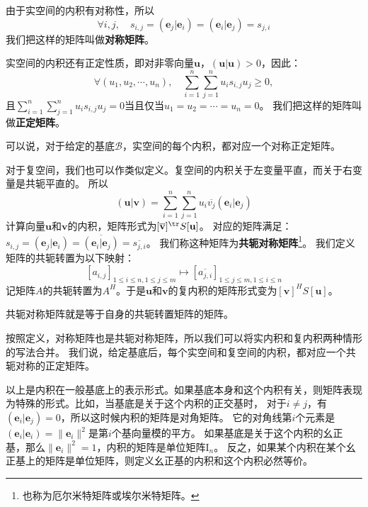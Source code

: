 \documentclass[12pt,UTF8,fontset=none]{ctexbook}
\begin{document}
由于实空间的内积有对称性，所以
$$\forall i, j, \quad s_{i,j} = (\mathbf{e}_j |\mathbf{e}_i ) = (\mathbf{e}_i |\mathbf{e}_j ) = s_{j,i}$$
我们把这样的矩阵叫做\textbf{对称矩阵}。

实空间的内积还有正定性质，即对非零向量$\mathbf{u}$，$(\mathbf{u} | \mathbf{u}) > 0$，因此：
$$\forall (u_1, u_2, \cdots, u_n), \quad \sum_{i=1}^n \sum_{j=1}^n u_i s_{i,j} u_j \geqslant 0,$$
且$\sum_{i=1}^n \sum_{j=1}^n u_i s_{i,j} u_j = 0$当且仅当$u_1 = u_2 = \cdots = u_n = 0$。
我们把这样的矩阵叫做\textbf{正定矩阵}。

可以说，对于给定的基底$\mathcal{B}$，实空间的每个内积，都对应一个对称正定矩阵。

对于复空间，我们也可以作类似定义。复空间的内积关于左变量平直，而关于右变量是共轭平直的。
所以
$$ ( \mathbf{u} |  \mathbf{v} ) = \sum_{i=1}^n \sum_{j=1}^n u_i \overline{v_j} (\mathbf{e}_i|\mathbf{e}_j) $$
计算向量$\mathbf{u}$和$\mathbf{v}$的内积，矩阵形式为$[\overline{\mathbf{v}}]^{\tr} S [\mathbf{u}]$。
对应的矩阵满足：$s_{i,j} = (\mathbf{e}_j|\mathbf{e}_i) = \overline{(\mathbf{e}_i|\mathbf{e}_j)} = \overline{s_{j,i}}$。
我们称这种矩阵为\textbf{共轭对称矩阵}\footnote{也称为厄尔米特矩阵或埃尔米特矩阵。}。
我们定义矩阵的共轭转置为以下映射：
$$ [a_{i,j}]_{1 \leqslant i \leqslant n, 1 \leqslant j \leqslant m} \mapsto [\overline{a_{j,i}}]_{1 \leqslant j \leqslant m, 1 \leqslant i \leqslant n}$$
记矩阵$A$的共轭转置为$A^H$。于是$\mathbf{u}$和$\mathbf{v}$的复内积的矩阵形式变为$[\mathbf{v}]^H S [\mathbf{u}]$。

共轭对称矩阵就是等于自身的共轭转置矩阵的矩阵。

按照定义，对称矩阵也是共轭对称矩阵，所以我们可以将实内积和复内积两种情形的写法合并。
我们说，给定基底后，每个实空间和复空间的内积，都对应一个共轭对称的正定矩阵。

以上是内积在一般基底上的表示形式。如果基底本身和这个内积有关，则矩阵表现为特殊的形式。比如，当基底是关于这个内积的正交基时，
对于$i \neq j$，有$(\mathbf{e}_i |\mathbf{e}_j ) = 0$，所以这时候内积的矩阵是对角矩阵。
它的对角线第$i$个元素是$(\mathbf{e}_i |\mathbf{e}_i) = \| \mathbf{e}_i \|^2$是第$i$个基向量模的平方。
如果基底是关于这个内积的幺正基，那么$\| \mathbf{e}_i \|^2 = 1$，内积的矩阵是单位矩阵$\mathrm{I}_n$。
反之，如果某个内积在某个幺正基上的矩阵是单位矩阵，则定义幺正基的内积和这个内积必然等价。
\end{document}
